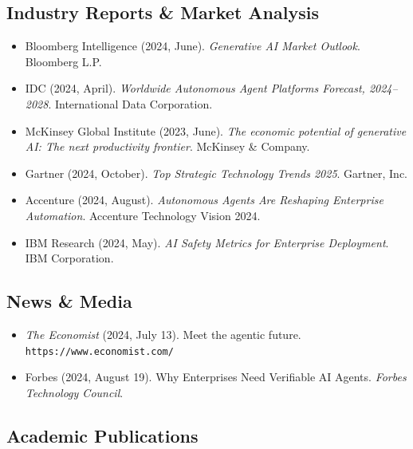 \documentclass[11pt]{article}
\begin{document}
\subsection*{Industry Reports \& Market Analysis}

\begin{itemize}[leftmargin=*, label={}]
  \item Bloomberg Intelligence (2024, June). \textit{Generative AI Market Outlook}. Bloomberg L.P.

  \item IDC (2024, April). \textit{Worldwide Autonomous Agent Platforms Forecast, 2024--2028}. International Data Corporation.

  \item McKinsey Global Institute (2023, June). \textit{The economic potential of generative AI: The next productivity frontier}. McKinsey \& Company.

  \item Gartner (2024, October). \textit{Top Strategic Technology Trends 2025}. Gartner, Inc.

  \item Accenture (2024, August). \textit{Autonomous Agents Are Reshaping Enterprise Automation}. Accenture Technology Vision 2024.

  \item IBM Research (2024, May). \textit{AI Safety Metrics for Enterprise Deployment}. IBM Corporation.
\end{itemize}

\subsection*{News \& Media}

\begin{itemize}[leftmargin=*, label={}]
  \item \textit{The Economist} (2024, July 13). Meet the agentic future. \texttt{https://www.economist.com/}

  \item Forbes (2024, August 19). Why Enterprises Need Verifiable AI Agents. \textit{Forbes Technology Council}.
\end{itemize}

\subsection*{Academic Publications}
\end{document}

